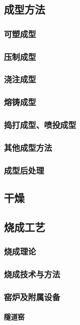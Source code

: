 \documentclass[UTF8]{../../ApplicationUniverse}
\begin{document}
    \subsection{成型方法}
        \subsubsection{可塑成型}
        \subsubsection{压制成型}
        \subsubsection{浇注成型}
        \subsubsection{熔铸成型}
        \subsubsection{捣打成型、喷投成型}
        \subsubsection{其他成型方法}
        \subsubsection{成型后处理}
    \subsection{干燥}
    \subsection{烧成工艺}
        \subsubsection{烧成理论}
        \subsubsection{烧成技术与方法}
        \subsubsection{窑炉及附属设备}
            \paragraph{隧道窑}
\end{document}
